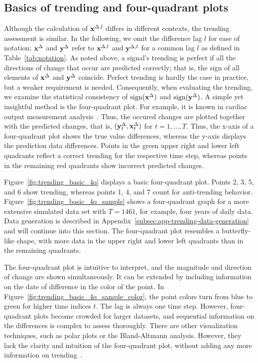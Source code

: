 \subsection{Basics of trending and four-quadrant plots}\label{subsec:trending-basics}

Although the calculation of $\mathbf{x}^{\Delta,l}$ differs in different contexts, the trending assessment is similar.
In the following, we omit the difference lag $l$ for ease of notation; $\mathbf{x}^{\Delta}$ and $\mathbf{y}^{\Delta}$ refer to $\mathbf{x}^{\Delta,l}$ and $\mathbf{y}^{\Delta,l}$ for a common lag $l$ as defined in Table~\ref{tab:notation}.
As noted above, a signal's trending is perfect if all the directions of change that occur are predicted correctly; that is, the sign of all elements of $\mathbf{x}^{\Delta}$ and $\mathbf{y}^{\Delta}$ coincide.
Perfect trending is hardly the case in practice, but a weaker requirement is needed.
Consequently, when evaluating the trending, we examine the statistical consistency of $\operatorname{sign}(\mathbf{x}^{\Delta})$ and $\operatorname{sign}(\mathbf{y}^{\Delta})$.
A simple yet insightful method is the four-quadrant plot.
For example, it is known in cardiac output measurement analysis~\parencite{Saugel2015,perrino1998intraoperative}. 
Thus, the occured changes are plotted together with the predicted changes, that is, $(\mathbf{y}^{\Delta}_t, \mathbf{x}^{\Delta}_t)$ for $t = 1, \dots, T$.
Thus, the x-axis of a four-quadrant plot shows the true value differences, whereas the y-axis displays the prediction data differences.
Points in the green upper right and lower left quadrants reflect a correct trending for the respective time step, whereas points in the remaining red quadrants show incorrect predicted changes.

Figure~\ref{fig:trending_basic_4q} displays a basic four-quadrant plot.
Points 2, 3, 5, and 6 show trending, whereas points 1, 4, and 7 count for anti-trending behavior.
Figure~\ref{fig:trending_basic_4q_sample} shows a four-quadrant graph for a more extensive simulated data set with $T=1461$, for example, four years of daily data.
Data generation is described in Appendix~\ref{subsec:app-trending-data-generation} and will continue into this section.
The four-quadrant plot resembles a butterfly-like shape, with more data in the upper right and lower left quadrants than in the remaining quadrants.

The four-quadrant plot is intuitive to interpret, and the magnitude and direction of change are shown simultaneously.
It can be extended by including information on the date of difference in the color of the point.
In Figure~\ref{fig:trending_basic_4q_sample_color}, the point colors turn from blue to green for higher time indices $t$.
The lag is always one time step.
However, four-quadrant plots become crowded for larger datasets, and sequential information on the differences is complex to assess thoroughly.
There are other visualization techniques, such as polar plots or the Bland-Altmann analysis.
However, they lack the clarity and intuition of the four-quadrant plot, without adding any more information on trending~\parencite{Saugel2015}.

